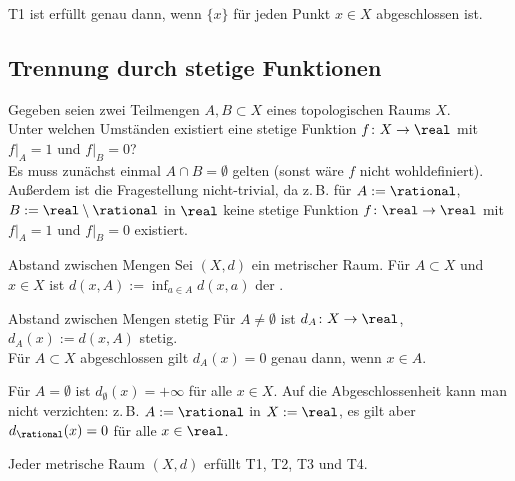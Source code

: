 \begin{Bem}
    T1 ist erfüllt genau dann, wenn $\{x\}$ für jeden Punkt $x \in X$
    abgeschlossen ist.
\end{Bem}

\subsection{%
    Trennung durch stetige Funktionen%
}

\begin{Bem}
    Gegeben seien zwei Teilmengen $A, B \subset X$ eines
    topologischen Raums $X$. \\
    Unter welchen Umständen existiert eine stetige Funktion
    $f\colon X \rightarrow \real$ mit $f|_A = 1$ und $f|_B = 0$? \\
    Es muss zunächst einmal $A \cap B = \emptyset$ gelten
    (sonst wäre $f$ nicht wohldefiniert). \\
    Außerdem ist die Fragestellung nicht-trivial, da z.\,B. für
    $A := \rational$, $B := \real \setminus \rational$ in $\real$
    keine stetige Funktion $f\colon \real \rightarrow \real$
    mit $f|_A = 1$ und $f|_B = 0$ existiert.
\end{Bem}

\begin{Def}{Abstand zwischen Mengen}
    Sei $(X, d)$ ein metrischer Raum.
    Für $A \subset X$ und $x \in X$ ist $d(x, A) := \inf_{a \in A} d(x, a)$
    der .
\end{Def}

\begin{Lemma}{Abstand zwischen Mengen stetig}
    Für $A \not= \emptyset$ ist $d_A\colon X \rightarrow \real$,
    $d_A(x) := d(x, A)$ stetig. \\
    Für $A \subset X$ abgeschlossen gilt $d_A(x) = 0$ genau dann, wenn
    $x \in A$.
\end{Lemma}

\begin{Bem}
    Für $A = \emptyset$ ist $d_\emptyset(x) = +\infty$ für alle $x \in X$.
    Auf die Abgeschlossenheit kann man nicht verzichten:
    z.\,B. $A := \rational$ in $X := \real$, es gilt aber $d_\rational(x) = 0$
    für alle $x \in \real$.
\end{Bem}

\begin{Kor}
    Jeder metrische Raum $(X, d)$ erfüllt T1, T2, T3 und T4.
\end{Kor}

